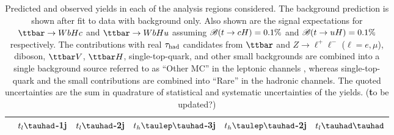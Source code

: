 \begin{table}[htbp]
\caption{
  Predicted and observed yields in each of the analysis regions considered. The background prediction is shown after fit to data with background only.
  Also shown are the signal expectations for $\Hc$ and
  $\Hu$ assuming $\mathscr{B}(t\to cH)=0.1\%$ and $\mathscr{B}(t\to uH)=0.1\%$ respectively. The contributions with real $\tau_{\mathrm{had}}$ candidates from $\ttbar$ and  $Z\to \ell^+\ell^-$ ($\ell = e, \mu$),
  diboson, $\ttbar V$, $\ttbar H$, single-top-quark, and other small backgrounds are combined into a single background source referred to as ``Other MC'' in the leptonic channels ,
  whereas single-top-quark and the small contributions are combined into ``Rare'' in the hadronic channels.
  The quoted uncertainties are the sum in quadrature of statistical and systematic uncertainties of the yields. ({\textbf to be updated?})}
\small
\centering

\begin{tabular}{cccccc} \toprule\toprule
 & $t_l\tauhad$-1j & $t_l\tauhad$-2j & $t_h\tlhad$-3j &$t_h\tlhad$-2j  & $t_l\thadhad$ \\\hline


\end{tabular}
\end{table}
